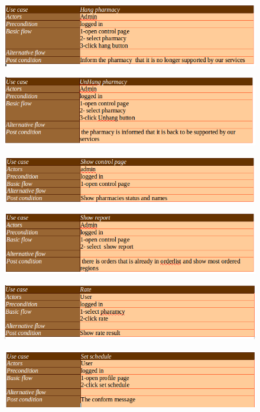 \documentclass[]{article}
\begin{document}
\begin{figure}[H]
\centering
\includegraphics[scale=0.4]{./scenario/11}
\end{figure}
\begin{figure}[H]
\centering
\includegraphics[scale=0.4]{./scenario/12}
\end{figure}
\begin{figure}[H]
\centering
\includegraphics[scale=0.4]{./scenario/13}
\end{figure}
\begin{figure}[H]
\centering
\includegraphics[scale=0.4]{./scenario/14}
\end{figure}
\begin{figure}[H]
\centering
\includegraphics[scale=0.4]{./scenario/15}
\end{figure}
\begin{figure}[H]
\centering
\includegraphics[scale=0.4]{./scenario/16}
\end{figure}
\end{document}
